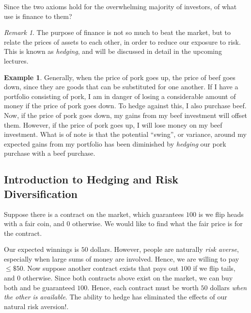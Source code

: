 \documentclass[12pt]{article}
\theoremstyle{plain}
\theoremstyle{definition}
\newtheorem*{example}{Example}
\theoremstyle{remark}
\newtheorem*{remark}{Remark}
\numberwithin{equation}{section}  %
\begin{document}
Since the two axioms hold for the overwhelming majority of investors, of what 
use
is finance to them? 
\begin{remark}
	The purpose of finance is not so much to beat the market,
	but to relate the prices of assets to each other, in order to reduce our 
	exposure to risk. This is known as \emph{hedging}, and will be discussed in 
	detail in the upcoming lectures.  
\end{remark}
\begin{example}
	Generally, when the price of pork goes up, the price of beef goes down, 
	since
	they are goods that can be substituted for one another. If I have a 
	portfolio
	consisting of pork, I am in danger of losing a considerable amount of money
	if the price of pork goes down. To hedge against this, I also purchase beef.
	Now, if the price of pork goes down, my gains from my beef investment will
	offset them. However, if the price of pork goes up, I will lose money on my
	beef investment. What is of note is that the potential ``swing'', or
	variance, around my expected gains from my portfolio has been diminished by
	\emph{hedging} our pork purchase with a beef purchase.
\end{example}
\subsection{Introduction to Hedging and Risk Diversification}
Suppose there is a contract on the market, which guarantees $100$ is we flip 
heads with a fair coin, and $0$ otherwise. We would like to find what the fair 
price is for the contract. 

Our expected winnings is $50$ dollars. However, people are naturally \emph{risk 
averse}, especially when large sums of money are involved. Hence, we are 
willing to pay $\le \$50$. Now suppose another contract exists that pays out 
$100$ if we flip tails, and $0$ otherwise. Since both contracts above exist on 
the market, we can buy both and be guaranteed $100$. Hence, each contract must 
be worth $50$ dollars \emph{when the other is available}.  The ability to hedge 
has eliminated the effects of our natural risk aversion!. 
\end{document}
